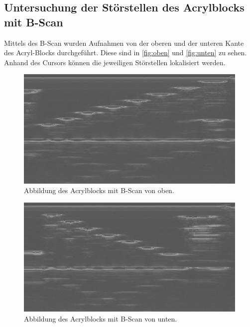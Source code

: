 \subsection{Untersuchung der Störstellen des Acrylblocks mit B-Scan}
\label{sec:Untersuchung der Störstellen des Aceylblocks mit B-Scan}

Mittels des B-Scan wurden Aufnahmen von der oberen und der unteren Kante des Acryl-Blocks durchgeführt.
Diese sind in \autoref{fig:oben} und \autoref{fig:unten} zu sehen. Anhand des Cursors können die jeweiligen Störstellen 
lokalisiert werden.

\begin{figure}[H]
    \centering
	\includegraphics[width=0.8\linewidth]{data/US1_daten/b_scan_oben.jpg}
    \captionsetup{width=0.765\linewidth}
	\caption{Abbildung des Acrylblocks mit B-Scan von oben.}
	\label{fig:oben}
\end{figure}

\begin{figure}[H]
    \centering
	\includegraphics[width=0.8\linewidth]{data/US1_daten/b_scan_u.jpg}
    \captionsetup{width=0.765\linewidth}
	\caption{Abbildung des Acrylblocks mit B-Scan von unten.}
	\label{fig:unten}
\end{figure}

